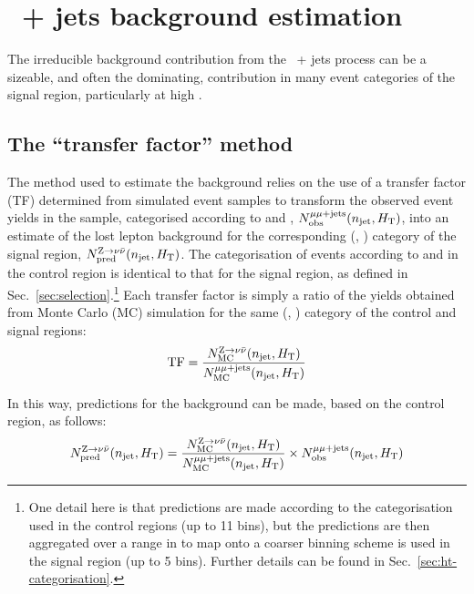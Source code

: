 
\section{\texorpdfstring{\znunu\ + jets}{Zinv} background estimation}
\label{sec:zinv}

The irreducible background contribution from the \znunu\ + jets
process can be a sizeable, and often the dominating, contribution in
many event categories of the signal region, particularly at high
\HTmiss. 


\subsection{The ``transfer factor'' method}
\label{sec:tf-method-zinv}

The method used to estimate the \znunuj background relies on the use
of a transfer factor (TF) determined from simulated event samples to
transform the observed event yields in the \mmj sample, categorised
according to \njet and \scalht, $N_{\textrm{obs}}^{\mu\mu + \textrm{jets}}(n_{\text{jet}}, \mbox{$H_\text{T}$})$, into
an estimate of the lost lepton background for the corresponding
(\njet, \scalht) category of the signal region, $N_{\textrm{pred}}^{{\text Z} \rightarrow \nu\bar{\nu}}(n_{\text{jet}},
\mbox{$H_\text{T}$})$. The categorisation of events according to \njet and \scalht
in the \mmj control region is identical to that for the signal region,
as defined in Sec.~\ref{sec:selection}.\footnote{One detail here is
  that predictions are made according to the \scalht categorisation
  used in the control regions (up to 11 bins), but the predictions are
  then aggregated over a range in \scalht to map onto a coarser
  binning scheme is used in the signal region (up to 5 bins). Further
  details can be found in Sec.~\ref{sec:ht-categorisation}.}  Each
transfer factor is simply a ratio of the yields obtained from Monte
Carlo (MC) simulation for the same (\njet, \scalht) category of the
\mmj control and signal regions:
\begin{equation}
  \label{equ:tf-ratio-zinv}
  {\rm TF} = \frac{N_{\rm MC}^{{\text Z} \rightarrow \nu\bar{\nu}}(n_{\text{jet}}, \mbox{$H_\text{T}$})}{N_{\rm MC}^{\mu\mu + \textrm{jets}}(n_{\text{jet}}, \mbox{$H_\text{T}$})} 
\end{equation}

In this way, predictions for the \znunuj background can be made, based
on the \mmj control region, as follows:
\begin{equation}
  \label{equ:pred-method-zinv}
  N_{\textrm{pred}}^{{\text Z} \rightarrow \nu\bar{\nu}}(n_{\text{jet}}, \mbox{$H_\text{T}$}) = 
  \frac{N_{\rm MC}^{{\text Z} \rightarrow \nu\bar{\nu}}(n_{\text{jet}}, \mbox{$H_\text{T}$})}{N_{\rm MC}^{\mu\mu + \textrm{jets}}(n_{\text{jet}}, \mbox{$H_\text{T}$})} 
  \times 
  N_{\textrm{obs}}^{\mu\mu + \textrm{jets}}(n_{\text{jet}}, \mbox{$H_\text{T}$})   
\end{equation}

